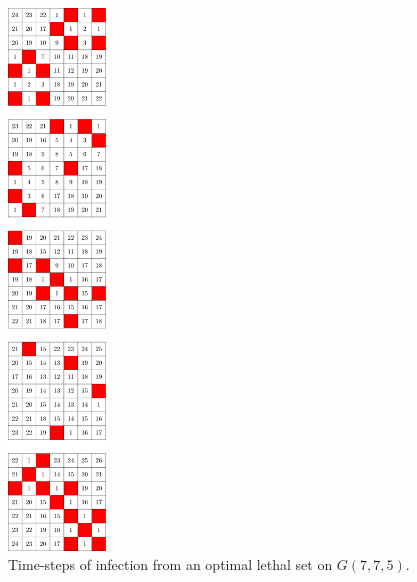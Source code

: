 \begin{figure}[H]
\centering
\includegraphics[width=0.23\textwidth]{figures/A/7x7x5_numbered_heatmap.pdf}
\caption{Time-steps of infection from an optimal lethal set on $G(7,7,5)$.}
\label{fig:7x7x5_numbered_heatmap}
\end{figure}


